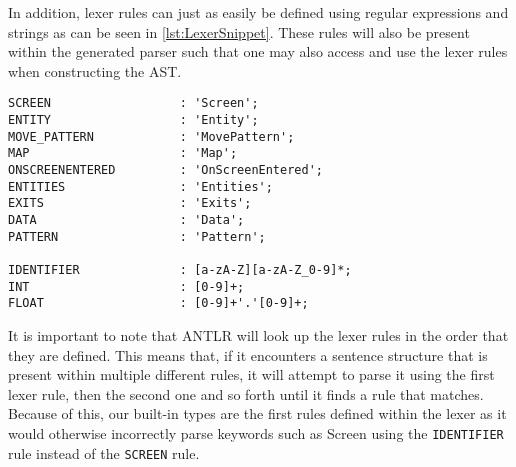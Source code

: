 In addition, lexer rules can just as easily be defined using regular expressions and strings as can be seen in \ref{lst:LexerSnippet}.
These rules will also be present within the generated parser such that one may also access and use the lexer rules when constructing the AST. 

\begin{lstlisting}[caption={A snippet of few lexer rules for \dazel{}.}, label={lst:LexerSnippet}]
SCREEN                  : 'Screen';
ENTITY                  : 'Entity';
MOVE_PATTERN            : 'MovePattern';
MAP                     : 'Map';
ONSCREENENTERED         : 'OnScreenEntered';
ENTITIES                : 'Entities';
EXITS                   : 'Exits';
DATA                    : 'Data';
PATTERN                 : 'Pattern';

IDENTIFIER              : [a-zA-Z][a-zA-Z_0-9]*;
INT                     : [0-9]+;
FLOAT                   : [0-9]+'.'[0-9]+;	
\end{lstlisting}

It is important to note that ANTLR will look up the lexer rules in the order that they are defined. 
This means that, if it encounters a sentence structure that is present within multiple different rules, it will attempt to parse it using the first lexer rule, then the second one and so forth until it finds a rule that matches. 
Because of this, our built-in types are the first rules defined within the lexer as it would otherwise incorrectly parse keywords such as Screen using the \texttt{IDENTIFIER} rule instead of the \texttt{SCREEN} rule\cite{parrDefinitiveANTLRReference2012}.
